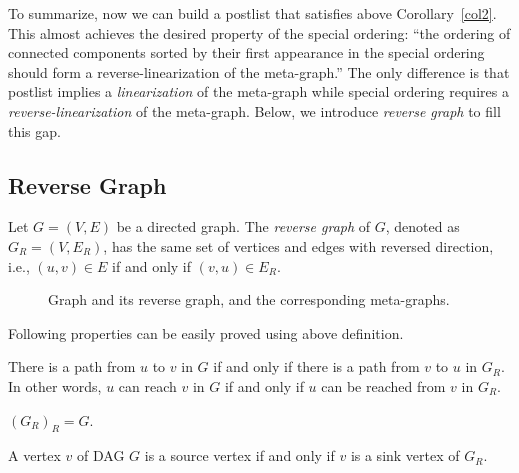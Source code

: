 
To summarize, now we can build a postlist that satisfies above Corollary~\ref{col2}.
This almost achieves the desired property of the special ordering:
``the ordering of connected components sorted by their first appearance in the
special ordering should form a reverse-linearization of the meta-graph.''
The only difference is that postlist implies a \emph{linearization} of the meta-graph
while special ordering requires a \emph{reverse-linearization} of the meta-graph.
Below, we introduce \emph{reverse graph} to fill this gap.

\subsection*{Reverse Graph}

\begin{definition}
Let $G = (V,E)$ be a directed graph. The \emph{reverse graph} of $G$, denoted as $G_R = (V, E_R)$,
has the same set of vertices and edges with reversed direction, i.e., $(u,v) \in E$ if and only if $(v,u)\in E_R$.
\end{definition}

\begin{figure}[h!]
\centering{}
\caption{Graph and its reverse graph, and the corresponding meta-graphs.}
\label{fig:reverse}
\end{figure}

Following properties can be easily proved using above definition.

\begin{property}
There is a path from $u$ to $v$ in $G$ if and only if there is a path from $v$ to $u$ in $G_R$.
In other words, $u$ can reach $v$ in $G$ if and only if $u$ can be reached from $v$ in $G_R$.
\end{property}

\begin{property}
$(G_R)_R = G$.
\end{property}

\begin{property}
A vertex $v$ of DAG $G$ is a source vertex if and only if $v$ is a sink vertex of $G_R$.
\end{property}


